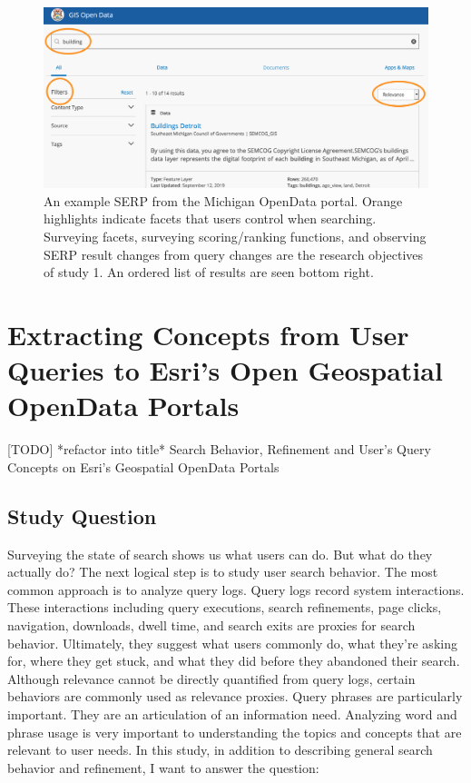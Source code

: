 \begin{figure}[H]
    \centering
    \includegraphics[width=1\textwidth]{../figures/Methods_OpenData.png}
    \caption{An example SERP from the Michigan OpenData portal. Orange highlights indicate facets that users control when searching. Surveying facets, surveying scoring/ranking functions, and observing SERP result changes from query changes are the research objectives of study 1. An ordered list of results are seen bottom right.}
    \label{fig:Methods_OpenData}
\end{figure}

\section{Extracting Concepts from User Queries to Esri's Open Geospatial OpenData Portals}

[TODO] *refactor into title*
Search Behavior, Refinement and User's Query Concepts on Esri’s Geospatial OpenData Portals


\subsection{Study Question}
Surveying the state of search shows us what users can do. But what do they actually do? The next logical step is to study user search behavior. The most common approach is to analyze query logs. Query logs record system interactions. These interactions including query executions, search refinements, page clicks, navigation, downloads, dwell time, and search exits are proxies for search behavior. Ultimately, they suggest what users commonly do, what they’re asking for, where they get stuck, and what they did before they abandoned their search. Although relevance cannot be directly quantified from query logs, certain behaviors are commonly used as relevance proxies. Query phrases are particularly important. They are an articulation of an information need. Analyzing word and phrase usage is very important to understanding the topics and concepts that are relevant to user needs. In this study, in addition to describing general search behavior and refinement, I want to answer the question:
\linebreak

